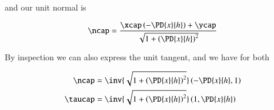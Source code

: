 and our unit normal is

\begin{equation}\label{eqn:continuumL13:320}
\ncap = 
\frac{\xcap \left( -\PD{x}{h} \right) + \ycap}{
\sqrt{ 1 + \left( \PD{x}{h} \right)^2 }
}
\end{equation}

By inspection we can also express the unit tangent, and we have for both

\begin{align}\label{eqn:continuumL13:340}
\ncap &= 
\inv{
\sqrt{ 1 + \left( \PD{x}{h} \right)^2 }
}
\left( -\PD{x}{h}, 1 \right)  \\
\taucap &= 
\inv{
\sqrt{ 1 + \left( \PD{x}{h} \right)^2 }
}
\left( 1, \PD{x}{h} \right)
\end{align}

\EndNoBibArticle
